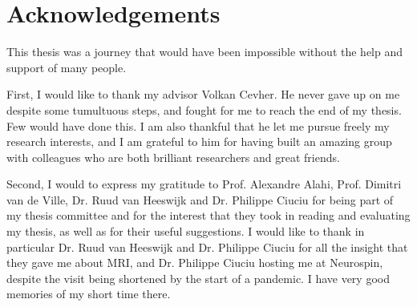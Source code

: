 \chapter*{Acknowledgements}

\bigskip
 
This thesis was a journey that would have been impossible without the help and support of many people.
\vspace{0.5cm}

First, I would like to thank my advisor Volkan Cevher. He never gave up on me despite some tumultuous steps, and fought for me to reach the end of my thesis. Few would have done this. I am also thankful that he let me pursue freely my research interests, and I am grateful to him for having built an amazing group with colleagues who are both brilliant researchers and great friends. %
\vspace{0.5cm}

Second, I would to express my gratitude to Prof. Alexandre Alahi, Prof. Dimitri van de Ville, Dr. Ruud van Heeswijk and Dr. Philippe Ciuciu for being part of my thesis committee and for the interest that they took in reading and evaluating my thesis, as well as for their useful suggestions. I would like to thank in particular Dr. Ruud van Heeswijk and Dr. Philippe Ciuciu for all the insight that they gave me about MRI, and Dr. Philippe Ciuciu hosting me at Neurospin, despite the visit being shortened by the start of a pandemic. I have very good memories of my short time there.

\vspace{0.5cm}

